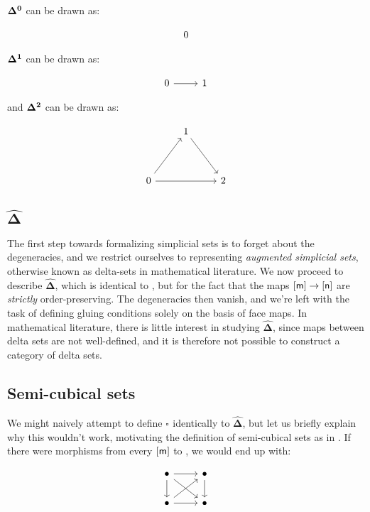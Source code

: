 \documentclass[10pt]{art}
\newcommand{\DeltaHat}{\ensuremath{\hat{\boldsymbol{\Delta}}}}
\newcommand{\Cube}[1]{\ensuremath{\boldsymbol{\square^{#1}}}}
\begin{document}
\begin{example}
  $\boldsymbol{\Delta^{0}}$ can be drawn as:

  $$
    \begin{tikzcd}
      0
    \end{tikzcd}
  $$

  $\boldsymbol{\Delta^{1}}$ can be drawn as:

  $$
    \begin{tikzcd}
      0 \arrow[r] & 1
    \end{tikzcd}
  $$

  and $\boldsymbol{\Delta^{2}}$ can be drawn as:

  $$
    \begin{tikzcd}
      & 1 \arrow[ddr] & \\
      \\
      0 \arrow[uur] \arrow[rr] & & 2
    \end{tikzcd}
  $$
\end{example}

\subsection{\texorpdfstring{\DeltaHat}{Delta sets}}
The first step towards formalizing simplicial sets is to forget about the degeneracies, and we restrict ourselves to representing \emph{augmented simplicial sets}, otherwise known as delta-sets in mathematical literature. We now proceed to describe \DeltaHat, which is identical to \Simplex{}, but for the fact that the maps $\mathsf{[m]} \rightarrow \mathsf{[n]}$ are \emph{strictly} order-preserving. The degeneracies then vanish, and we're left with the task of defining gluing conditions solely on the basis of face maps. In mathematical literature, there is little interest in studying \DeltaHat, since maps between delta sets are not well-defined, and it is therefore not possible to construct a category of delta sets.

\subsection{Semi-cubical sets}
We might naively attempt to define $\Cube{}$ identically to \DeltaHat, but let us briefly explain why this wouldn't work, motivating the definition of semi-cubical sets as in \cite{Antolini00}. If there were morphisms from every $\mathsf{[m]}$ to , we would end up with:

$$
  \begin{tikzcd}
    \bullet \arrow[r] \arrow[dr] \arrow[d] & \bullet \arrow[d] \\
    \bullet \arrow[r] \arrow[ur] & \bullet
  \end{tikzcd}
$$
\end{document}

